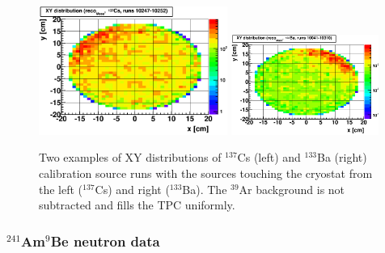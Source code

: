 \begin{figure}[htbp]
\centering
\includegraphics[width=0.55\textwidth]{./Figures/XY_Cs137_200Vcm_run10247_10252.png}
\includegraphics[width=0.43\textwidth]{./Figures/XY_Ba133_driftHV200_run10041_10310_right.png}
\caption{Two examples of XY distributions of $^{137}$Cs (left) and $^{133}$Ba (right) calibration source runs with the sources touching the cryostat from the left ($^{137}$Cs) and right ($^{133}$Ba). The $^{39}$Ar background is not subtracted and fills the TPC uniformly.
\label{fig:CalibData:XY_distrib}}
\end{figure}



\subsubsection{$^{241}$Am$^9$Be neutron data}\label{sec:CalibData:NR}


